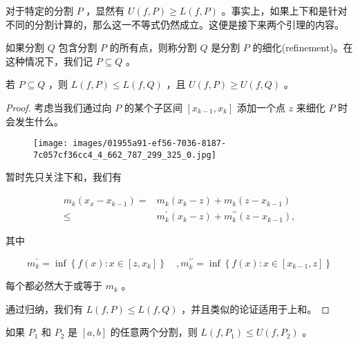 对于特定的分割 \(P\) ，显然有 \(U\left( {f,P}\right)  \geq  L\left( {f,P}\right)\) 。事实上，如果上下和是针对不同的分割计算的，那么这一不等式仍然成立。这便是接下来两个引理的内容。

\begin{Def}
  \label{def:7.2.2}
  如果分割 \(Q\) 包含分割 \(P\) 的所有点，则称分割 \(Q\) 是分割 \(P\) 的细化(refinement)。在这种情况下，我们记 \(P \subseteq  Q\) 。
\end{Def}

\begin{Lem}
  \label{lem:7.2.3}
  若 \(P \subseteq  Q\) ，则 \(L\left( {f,P}\right)  \leq  L\left( {f,Q}\right)\) ，且 \(U\left( {f,P}\right)  \geq  U\left( {f,Q}\right)\) 。
\end{Lem}

\begin{proof}

考虑当我们通过向 \(P\) 的某个子区间 \(\left\lbrack  {{x}_{k - 1},{x}_{k}}\right\rbrack\) 添加一个点 \(z\) 来细化 \(P\) 时会发生什么。

\begin{figure}[h]
  \centering
  \texttt{[image: images/01955a91-ef56-7036-8187-7c057cf36cc4\_4\_662\_787\_299\_325\_0.jpg]}
\end{figure}

暂时先只关注下和，我们有

\begin{align*}
  {m}_{k}\left( {{x}_{x} - {x}_{k - 1}}\right)  = &{m}_{k}\left( {{x}_{k} - z}\right)  + {m}_{k}\left( {z - {x}_{k - 1}}\right)\\
  \leq & {m}_{k}^{\prime }\left( {{x}_{k} - z}\right)  + {m}_{k}^{\prime \prime }\left( {z - {x}_{k - 1}}\right) ,
\end{align*}

其中

\[
{m}_{k}^{\prime } = \inf \left\{  {f\left( x\right)  : x \in  \left\lbrack  {z,{x}_{k}}\right\rbrack  }\right\}  \quad, {m}_{k}^{\prime \prime } = \inf \left\{  {f\left( x\right)  : x \in  \left\lbrack  {{x}_{k - 1},z}\right\rbrack  }\right\}
\]

每个都必然大于或等于 \({m}_{k}\) 。

通过归纳，我们有 \(L\left( {f,P}\right)  \leq  L\left( {f,Q}\right)\) ，并且类似的论证适用于上和。  
\end{proof}

\begin{Lem}
  \label{lem:7.2.4}
如果 \({P}_{1}\) 和 \({P}_{2}\) 是 \(\left\lbrack  {a,b}\right\rbrack\) 的任意两个分割，则 \(L\left( {f,{P}_{1}}\right)  \leq U\left( {f,{P}_{2}}\right)\) 。
\end{Lem}

